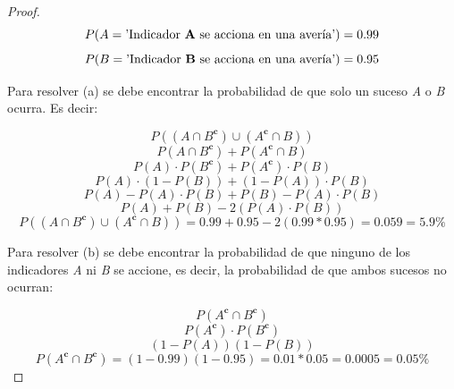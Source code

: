 \documentclass[12pt,a4paper]{article}
\begin{document}
\begin{proof}

  \begin{equation*}
    P(A = \text{'Indicador \textbf{A} se acciona en una avería'})=0.99
  \end{equation*}
  \begin{equation*}
    P(B = \text{'Indicador \textbf{B} se acciona en una avería'})=0.95
  \end{equation*}

  Para resolver (a) se debe encontrar la probabilidad de que solo un suceso \textit{A} o \textit{B} ocurra. Es decir:

  \begin{equation*}
    P((A\cap B^{\textbf{c}})\cup (A^{\textbf{c}}\cap B))
  \end{equation*}
  \begin{equation*}
    P(A\cap B^{\textbf{c}})+P(A^{\textbf{c}}\cap B)
  \end{equation*}
  \begin{equation*}
    P(A)\cdot P(B^{\textbf{c}})+P(A^{\textbf{c}})\cdot P(B)
  \end{equation*}
  \begin{equation*}
    P(A)\cdot (1-P(B))+(1-P(A))\cdot P(B)
  \end{equation*}
  \begin{equation*}
    P(A)-P(A)\cdot P(B)+P(B)-P(A)\cdot P(B)
  \end{equation*}
  \begin{equation*}
    P(A)+P(B)-2(P(A)\cdot P(B))
  \end{equation*}
  \begin{equation*}
    P((A\cap B^{\textbf{c}})\cup (A^{\textbf{c}}\cap B))=0.99+0.95-2(0.99*0.95)=0.059=5.9\%
  \end{equation*}

  Para resolver (b) se debe encontrar la probabilidad de que ninguno de los indicadores \textit{A} ni \textit{B} se accione, es decir, la probabilidad de que ambos sucesos no ocurran:

  \begin{equation*}
    P(A^{\textbf{c}}\cap B^{\textbf{c}})
  \end{equation*}
  \begin{equation*}
    P(A^{\textbf{c}})\cdot P(B^{\textbf{c}})
  \end{equation*}
  \begin{equation*}
    (1-P(A))(1-P(B))
  \end{equation*}
  \begin{equation*}
    P(A^{\textbf{c}}\cap B^{\textbf{c}})=(1-0.99)(1-0.95)=0.01*0.05=0.0005=0.05\%
  \end{equation*}

\end{proof}
\end{document}
